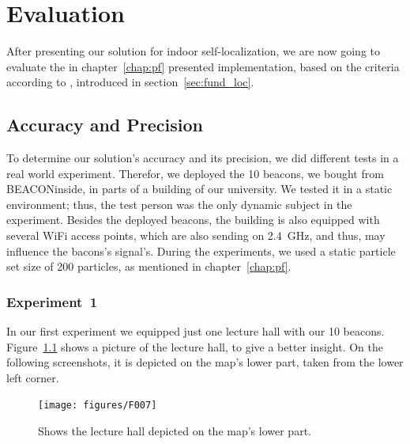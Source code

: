 \chapter{Evaluation} \label{chap:evaluation}
After presenting our solution for indoor self-localization, we are now going to evaluate the in chapter~\ref{chap:pf} presented implementation, based on the criteria according to \citet{IEEE:survey_wireless_indoor_pos}, introduced in section~\ref{sec:fund_loc}.

\section{Accuracy and Precision}
To determine our solution's accuracy and its precision, we did different tests in a real world experiment. Therefor, we deployed the 10 beacons, we bought from BEACONinside, in parts of a building of our university. We tested it in a static environment; thus, the test person was the only dynamic subject in the experiment. Besides the deployed beacons, the building is also equipped with several WiFi access points, which are also sending on 2.4~GHz, and thus, may influence the bacons's signal's. During the experiments, we used a static particle set size of 200 particles, as mentioned in chapter~\ref{chap:pf}.

\subsection*{Experiment~1}
In our first experiment we equipped just one lecture hall with our 10 beacons. Figure~\ref{fig:f007} shows a picture of the lecture hall, to give a better insight. On the following screenshots, it is depicted on the map's lower part, taken from the lower left corner.

\begin{figure}
	\texttt{[image: figures/F007]}
	\caption{Shows the lecture hall depicted on the map's lower part.}
	\label{fig:f007}
\end{figure}

